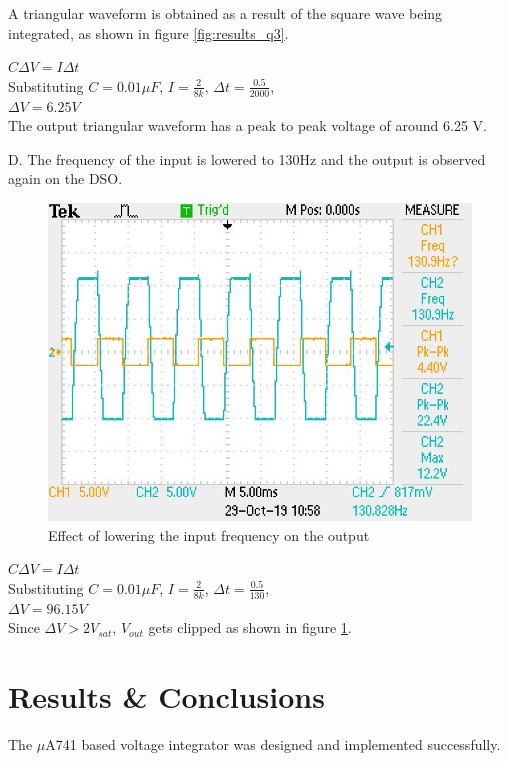 \documentclass[12pt, titlepage]{article}
\theoremstyle{definition}
\begin{document}
    A triangular waveform is obtained as a result of the square wave being integrated, as shown in figure \ref{fig:results_q3}.

    $C\Delta V=I\Delta t$\\
    Substituting $C=0.01\mu F$, $I=\frac{2}{8k}$, $\Delta t=\frac{0.5}{2000}$, \\
    $\Delta V = 6.25 V$\\
    The output triangular waveform has a peak to peak voltage of around 6.25 V.

    D. The frequency of the input is lowered to 130Hz and the output is observed again on the DSO.

    \begin{figure}
      \includegraphics[scale=0.25]{images/results_q4_2.jpeg}
      \caption{Effect of lowering the input frequency on the output}
      \label{fig:results_q4}
    \end{figure}

    $C\Delta V=I\Delta t$\\
    Substituting $C=0.01\mu F$, $I=\frac{2}{8k}$, $\Delta t=\frac{0.5}{130}$, \\
    $\Delta V = 96.15 V$ \\
    Since $\Delta V > 2V_{sat}$, $V_{out}$ gets clipped as shown in figure \ref{fig:results_q4}.


  \newpage
  \section{Results \& Conclusions}
    The $\mu$A741 based voltage integrator was designed and implemented successfully.
\end{document}
